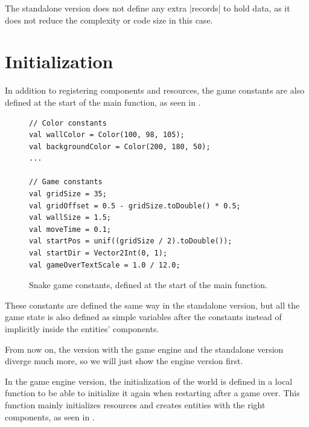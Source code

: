 The standalone version does not define any extra |records| to hold data, as it does not reduce the complexity or code size in this case.

\section{Initialization}

In addition to registering components and resources, the game constants are also defined at the start of the main function, as seen in .

\begin{figure}[h!]
\begin{lstlisting}
// Color constants
val wallColor = Color(100, 98, 105);
val backgroundColor = Color(200, 180, 50);
...

// Game constants
val gridSize = 35;
val gridOffset = 0.5 - gridSize.toDouble() * 0.5;
val wallSize = 1.5;
val moveTime = 0.1;
val startPos = unif((gridSize / 2).toDouble());
val startDir = Vector2Int(0, 1);
val gameOverTextScale = 1.0 / 12.0;
\end{lstlisting}
\caption{Snake game constants, defined at the start of the main function.}
\label{fig:caseconstants}
\end{figure}

These constants are defined the same way in the standalone version, but all the game state is also defined as simple variables after the constants instead of implicitly inside the entities' components.

From now on, the version with the game engine and the standalone version diverge much more, so we will just show the engine version first.

In the game engine version, the initialization of the world is defined in a local function to be able to initialize it again when restarting after a game over. This function mainly initializes resources and creates entities with the right components, as seen in .

